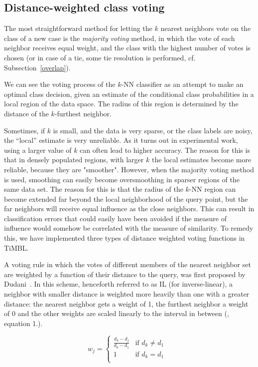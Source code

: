 \documentclass{report}
\begin{document}
\subsection{Distance-weighted class voting}
\label{distweightvote}

The most straightforward method for letting the $k$ nearest neighbors
vote on the class of a new case is the {\em majority voting} method,
in which the vote of each neighbor receives equal weight, and the
class with the highest number of votes is chosen (or in case of a tie,
some tie resolution is performed, cf. Subsection~\ref{overlap}).

We can see the voting process of the $k$-NN classifier as an attempt
to make an optimal class decision, given an estimate of the
conditional class probabilities in a local region of the data space.
The radius of this region is determined by the distance of the
$k$-furthest neighbor.

Sometimes, if $k$ is small, and the data is very sparse, or the class
labels are noisy, the ``local'' estimate is very unreliable.  As it
turns out in experimental work, using a larger value of $k$ can often
lead to higher accuracy. The reason for this is that in densely
populated regions, with larger $k$ the local estimates become more
reliable, because they are "smoother".  However, when the majority
voting method is used, smoothing can easily become oversmoothing in
sparser regions of the same data set. The reason for this is that the
radius of the $k$-NN region can become extended far beyond the local
neighborhood of the query point, but the far neighbors will receive
equal influence as the close neighbors. This can result in
classification errors that could easily have been avoided if the
measure of influence would somehow be correlated with the measure of
similarity. To remedy this, we have implemented three types of distance 
weighted voting functions in TiMBL.

A voting rule in which the votes of different members of the nearest
neighbor set are weighted by a function of their distance to the
query, was first proposed by Dudani~. In this
scheme, henceforth referred to as IL (for inverse-linear), a neighbor
with smaller distance is weighted more heavily than one with a greater
distance: the nearest neighbor gets a weight of 1, the furthest
neighbor a weight of 0 and the other weights are scaled linearly to
the interval in between (, equation 1.).

\begin{equation}
\label{dudani_eq}
w_{j}= \left \{ \begin{array}{ll}  
                        \frac{d_{k} - d_{j}}{d_{k} - d_{1}} & \mbox{if $d_{k}
\not= d_{1}$ } \\ 
                        1 & \mbox{if $d_{k} = d_{1}$}\\
                    \end{array} 
          \right. 
\end{equation}
\end{document}
